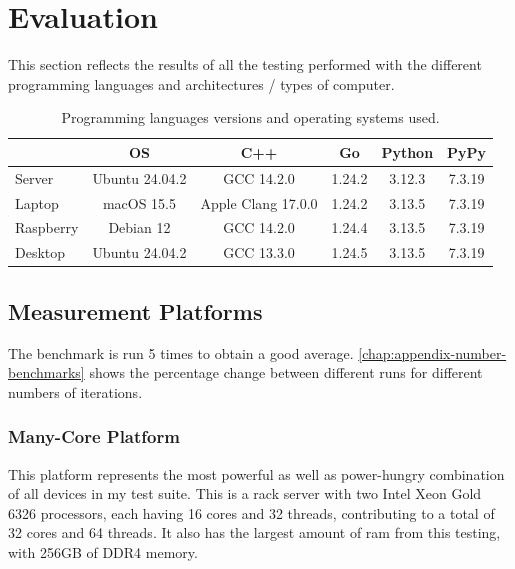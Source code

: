 \chapter{Evaluation}\label{chap:evaluation}

This section reflects the results of all the testing performed with the different programming languages and architectures / types of computer.

\begin{table}[ht]
  \centering
  \begin{tabular}{lccccc}
    \toprule
               & \gls{OS}       & C++                  & Go       & Python & PyPy \\
    \midrule
    Server     & Ubuntu 24.04.2 &  GCC 14.2.0          & 1.24.2  & 3.12.3 & 7.3.19 \\
    Laptop     & macOS 15.5     &  Apple Clang 17.0.0  & 1.24.2  & 3.13.5 & 7.3.19 \\
    Raspberry  & Debian 12      &  GCC 14.2.0          & 1.24.4  & 3.13.5 & 7.3.19 \\
    Desktop    & Ubuntu 24.04.2 &  GCC 13.3.0          & 1.24.5  & 3.13.5 & 7.3.19 \\
    \bottomrule
  \end{tabular}
  \caption[Language versions and compilers per platform]{Programming languages versions and operating systems used.}
  \label{tab:lang-platforms}
\end{table}

\section{Measurement Platforms}

The benchmark is run 5 times to obtain a good average. \autoref{chap:appendix-number-benchmarks} shows the percentage change between different runs for different numbers of iterations.

\subsection{Many-Core Platform}

This platform represents the most powerful as well as power-hungry combination of all devices in my test suite. This is a rack server with two Intel Xeon Gold 6326 processors, each having 16 cores and 32 threads, contributing to a total of 32 cores and 64 threads. It also has the largest amount of \gls{ram} from this testing, with 256GB of \gls{DDR4} memory.

